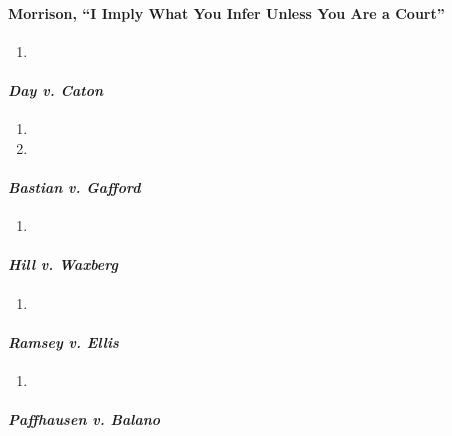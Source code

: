 \paragraph{Morrison, ``I Imply What You Infer Unless You Are a Court''}

\begin{enumerate}
    \item %
\end{enumerate}

\paragraph{\emph{Day v. Caton}}

\begin{enumerate}
    \item %
    \item %
\end{enumerate}

\paragraph{\emph{Bastian v. Gafford}}

\begin{enumerate}
    \item %
\end{enumerate}

\paragraph{\emph{Hill v. Waxberg}}

\begin{enumerate}
    \item %
\end{enumerate}

\paragraph{\emph{Ramsey v. Ellis}}

\begin{enumerate}
    \item %
\end{enumerate}

\paragraph{\emph{Paffhausen v. Balano}}

